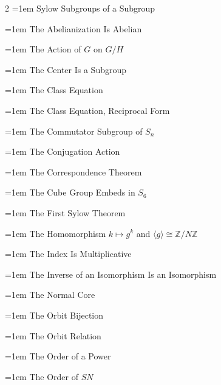 \documentclass[11pt]{report}
\begin{document}
\begin{multicols}{2}
\noindent\hangindent=1em Sylow Subgroups of a Subgroup\dotfill \pageref{prop:sylow-of-subgroup}\par
\noindent\hangindent=1em The Abelianization Is Abelian\dotfill \pageref{prop:abelianization-abelian}\par
\noindent\hangindent=1em The Action of $G$ on $G/H$\dotfill \pageref{prop:action-g-g-h}\par
\noindent\hangindent=1em The Center Is a Subgroup\dotfill \pageref{prop:center-subgroup}\par
\noindent\hangindent=1em The Class Equation\dotfill \pageref{thm:class-equation}\par
\noindent\hangindent=1em The Class Equation, Reciprocal Form\dotfill \pageref{cor:class-equation-reciprocal-form}\par
\noindent\hangindent=1em The Commutator Subgroup of $S_n$\dotfill \pageref{thm:commutator-subgroup-sn}\par
\noindent\hangindent=1em The Conjugation Action\dotfill \pageref{prop:conjugation-action}\par
\noindent\hangindent=1em The Correspondence Theorem\dotfill \pageref{thm:correspondence}\par
\noindent\hangindent=1em The Cube Group Embeds in $S_6$\dotfill \pageref{prop:cube-group-embeds-s6}\par
\noindent\hangindent=1em The First Sylow Theorem\dotfill \pageref{thm:sylow-first}\par
\noindent\hangindent=1em The Homomorphism $k \mapsto g^k$ and $\langle g \rangle \cong \mathbb{Z}/N\mathbb{Z}$\dotfill \pageref{prop:homomorphism-k-maps-gk-gen-g-iso-z-nz}\par
\noindent\hangindent=1em The Index Is Multiplicative\dotfill \pageref{prop:index-multiplicative}\par
\noindent\hangindent=1em The Inverse of an Isomorphism Is an Isomorphism\dotfill \pageref{prop:inverse-isomorphism-isomorphism}\par
\noindent\hangindent=1em The Normal Core\dotfill \pageref{prop:normal-core}\par
\noindent\hangindent=1em The Orbit Bijection\dotfill \pageref{prop:orbit-bijection}\par
\noindent\hangindent=1em The Orbit Relation\dotfill \pageref{prop:orbit-relation}\par
\noindent\hangindent=1em The Order of a Power\dotfill \pageref{prop:order-power}\par
\noindent\hangindent=1em The Order of $SN$\dotfill \pageref{cor:order-sn}\par

\end{multicols}
\end{document}
